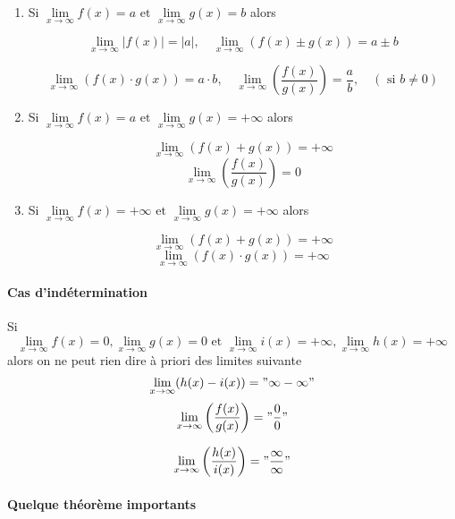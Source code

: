 \documentclass[
    11pt,
    a4paper,
    oneside,
    headinlcude, footinclude,
    twoside,
]{report}
\begin{document}
\begin{enumerate}
\item Si $\lim\limits_{x \to \infty} f (x) = a  \text{ et } \lim\limits_{x
\to \infty} g (x) = b $ alors

$$ \lim_{x \to \infty} |f(x)| = |a|, \quad \lim_{x \to \infty}
\left(f(x) \pm g(x)\right) = a \pm b$$

$$ \lim_{x \to \infty} \left( f (x) \cdot g(x)\right) = a \cdot b, \quad 
\lim_{x \to  \infty} \left( \frac{f(x)}{g(x)}\right) = \frac{a}{b},
\quad ( \text{ si }  b \neq 0) $$

\item Si $\lim\limits_{x \to \infty} f (x) = a  \text{ et } \lim\limits_{x
\to \infty} g (x) = + \infty $ alors

$$\lim_{x \to \infty} \left(f(x) + g(x)\right) = + \infty$$
$$\lim_{x \to \infty} \left( \frac{f(x)}{g(x)}\right) = 0$$

\item Si $\lim\limits_{x \to \infty} f (x) = + \infty  \text{ et } \lim\limits_{x \to \infty} g (x) = + \infty $ alors

$$\lim_{x \to \infty} \left(f(x) + g(x)\right) = + \infty$$
$$\lim_{x \to \infty} \left(f(x) \cdot g(x)\right) = + \infty$$
\end{enumerate}

\paragraph{Cas d'indétermination}
\label{par:cas_d_indetermination}

Si $$\lim\limits_{x \to \infty} f (x) = 0, \lim\limits_{x \to \infty} g (x) = 0  \text{ et } 
\lim\limits_{x \to \infty} i (x) = + \infty, \lim\limits_{x \to \infty} h (x) = + \infty $$ alors
on ne peut rien dire à priori des limites suivante 
$$ \lim_{x \to \infty} (h(x) - i(x)) = "\infty - \infty"$$
$$ \lim_{x \to \infty} \left(\frac{f(x)}{g(x)}\right) = "\frac{0}{0}"$$

$$ \lim_{x \to \infty} \left(\frac{h(x)}{i(x)}\right) = "\frac{\infty}{\infty}"$$





\paragraph{Quelque théorème importants}
\end{document}
